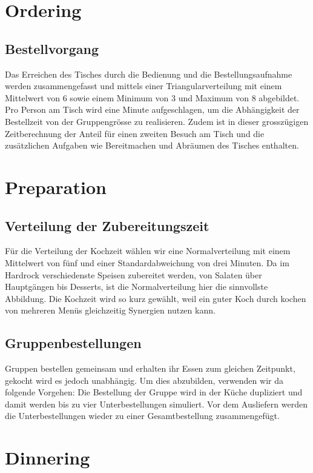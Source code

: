 \documentclass[ngerman,a4paper,12pt]{scrreprt}
\begin{document}
	
	\section{Ordering}			
		\subsection{Bestellvorgang}
			Das Erreichen des Tisches durch die Bedienung und die Bestellungsaufnahme werden zusammengefasst und mittels einer Triangularverteilung mit einem Mittelwert von 6 sowie einem Minimum von 3 und Maximum von 8 abgebildet. Pro Person am Tisch wird eine Minute aufgeschlagen, um die Abhängigkeit der Bestellzeit von der Gruppengrösse zu realisieren. Zudem ist in dieser grosszügigen Zeitberechnung der Anteil für einen zweiten Besuch am Tisch und die zusätzlichen Aufgaben wie Bereitmachen und Abräumen des Tisches enthalten.
	
	
	\section{Preparation}	
		\subsection{Verteilung der Zubereitungszeit}
			Für die Verteilung der Kochzeit wählen wir eine Normalverteilung mit einem Mittelwert von fünf und einer Standardabweichung von drei Minuten. Da im Hardrock verschiedenste Speisen zubereitet werden, von Salaten über Hauptgängen bis Desserts, ist die Normalverteilung hier die sinnvollste Abbildung. Die Kochzeit wird so kurz gewählt, weil ein guter Koch durch kochen von mehreren Menüs gleichzeitig Synergien nutzen kann.
	
	
		\subsection{Gruppenbestellungen}
			Gruppen bestellen gemeinsam und erhalten ihr Essen zum gleichen Zeitpunkt, gekocht wird es jedoch unabhängig. Um dies abzubilden, verwenden wir da folgende Vorgehen: Die Bestellung der Gruppe wird in der Küche dupliziert und damit werden bis zu vier Unterbestellungen simuliert. Vor dem Ausliefern werden die Unterbestellungen wieder zu einer Gesamtbestellung zusammengefügt.
			
			
	\section{Dinnering}
\end{document}
